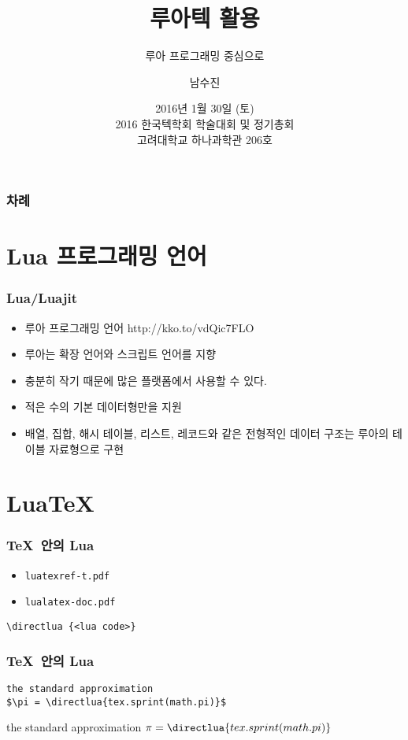 \documentclass{beamer}
\title{루아텍 활용}
\subtitle{루아 프로그래밍 중심으로}
\author{남수진}
\date{ 2016년 1월 30일 (토)\\
  2016 한국텍학회 학술대회 및 정기총회 \\
  {\small 고려대학교 하나과학관 206호}}
\begin{document}
\begin{frame}
  \titlepage
\end{frame}

\begin{frame}[t]
  \frametitle{차례}
  \tableofcontents
\end{frame}

\section{Lua 프로그래밍 언어}

\begin{frame}
  \frametitle{Lua/Luajit}
  \begin{itemize}
  \item 루아 프로그래밍 언어 http://kko.to/vdQic7FLO
  \item 루아는 확장 언어와 스크립트 언어를 지향
  \item 충분히 작기 때문에 많은 플랫폼에서 사용할 수 있다.
  \item 적은 수의 기본 데이터형만을 지원
  \item 배열, 집합, 해시 테이블, 리스트, 레코드와 같은 전형적인
    데이터 구조는 루아의 테이블 자료형으로 구현
  \end{itemize}
\end{frame}

\section{Lua\TeX}

\begin{frame}[fragile]
  \frametitle{\TeX\ 안의 Lua}
  \begin{itemize}
  \item \texttt{luatexref-t.pdf}
  \item \texttt{lualatex-doc.pdf}
  \end{itemize}
\begin{verbatim}
\directlua {<lua code>}
\end{verbatim}
\end{frame}

\begin{frame}[fragile]
  \frametitle{\TeX\ 안의 Lua}
\begin{verbatim}
the standard approximation 
$\pi = \directlua{tex.sprint(math.pi)}$
\end{verbatim}
\begin{center}
  the standard approximation $\pi = \directlua{tex.sprint(math.pi)}$
\end{center}
\end{frame}
\end{document}
